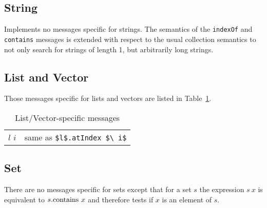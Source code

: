\documentclass[11pt]{amsart}
\newcommand{\tabparbox}[1] {\parbox{12cm}{

\vspace{0.1cm}
#1
\vspace{0.1cm}
}}
\newcommand{\babelsrc}[1] {\lstinline!#1!}
\begin{document}
\subsection{String} Implements no messages specific for strings. The semantics of the \babelsrc{indexOf} and \babelsrc{contains} messages is extended with respect to the usual collection semantics to not only search for strings of length 1, but arbitrarily long strings.

\subsection{List and Vector} Those messages specific for lists and vectors are listed in Table~\ref{tab:listvectorops}.  
\begin{table}
\caption{List/Vector-specific messages}
\begin{tabular}{c|c}
$l$ $i$ & \tabparbox{same as \babelsrc{$l$.atIndex $\ i$}}\\\hline
$-l$ & \tabparbox{reverses $l$}
\end{tabular}
\label{tab:listvectorops}
\end{table}

\subsection{Set}
There are no messages specific for sets except that for a set $s$ the expression $s\ x$ is equivalent to 
$s.\babelsrc{contains}\ x$ and therefore tests if $x$ is an element of $s$. 
\end{document}
